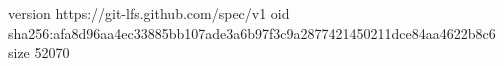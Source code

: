 version https://git-lfs.github.com/spec/v1
oid sha256:afa8d96aa4ec33885bb107ade3a6b97f3c9a2877421450211dce84aa4622b8c6
size 52070
